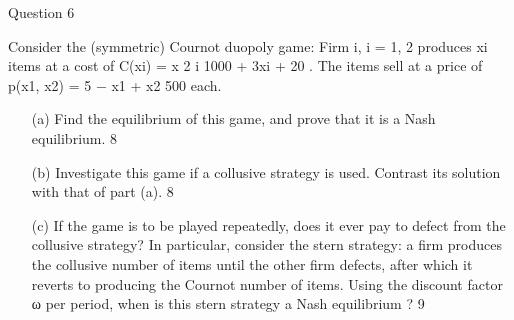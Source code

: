 \documentclass[a4paper,12pt]{article}
\begin{document}
Question 6 

Consider the (symmetric) Cournot duopoly game: Firm i, i = 1, 2 produces
xi
items at a cost of
C(xi) = x
2
i
1000 + 3xi + 20
. The items sell at a price of
p(x1, x2) = 5 −
x1 + x2
500
each.
\begin{itemize}
\item[(a)] Find the equilibrium of this game, and prove that it is a Nash equilibrium.
8 %
\item[(b)] Investigate this game if a collusive strategy is used. Contrast its solution
with that of part (a). 8 %
\item[(c)] If the game is to be played repeatedly, does it ever pay to defect from
the collusive strategy? In particular, consider the stern strategy: a firm
produces the collusive number of items until the other firm defects,
after which it reverts to producing the Cournot number of items. Using
the discount factor ω per period, when is this stern strategy a Nash
equilibrium ? 9 %
\end{itemize}
\end{document}
